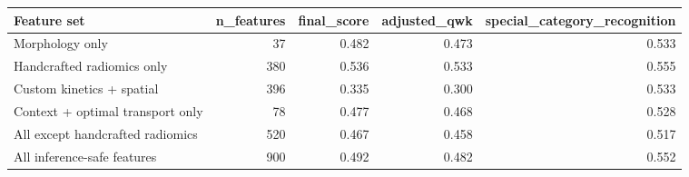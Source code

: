 \begin{tabular}{lrrrr}
\toprule
Feature set & n_features & final_score & adjusted_qwk & special_category_recognition \\
\midrule
Morphology only & 37 & 0.482 & 0.473 & 0.533 \\
Handcrafted radiomics only & 380 & 0.536 & 0.533 & 0.555 \\
Custom kinetics + spatial & 396 & 0.335 & 0.300 & 0.533 \\
Context + optimal transport only & 78 & 0.477 & 0.468 & 0.528 \\
All except handcrafted radiomics & 520 & 0.467 & 0.458 & 0.517 \\
All inference-safe features & 900 & 0.492 & 0.482 & 0.552 \\
\bottomrule
\end{tabular}
